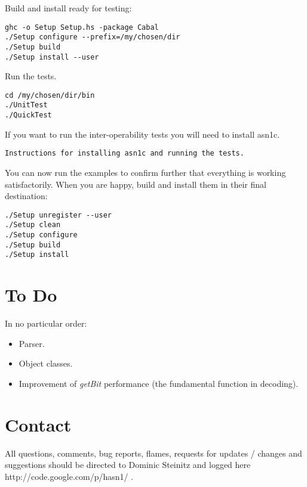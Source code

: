 \documentclass{article}
\begin{document}
Build and install ready for testing:

\begin{lstlisting}[frame=single]
ghc -o Setup Setup.hs -package Cabal
./Setup configure --prefix=/my/chosen/dir
./Setup build
./Setup install --user
\end{lstlisting}

Run the tests.

\begin{lstlisting}[frame=single]
cd /my/chosen/dir/bin
./UnitTest
./QuickTest
\end{lstlisting}

If you want to run the inter-operability tests you will need to install asn1c.

\begin{lstlisting}[frame=single]
Instructions for installing asn1c and running the tests.
\end{lstlisting}

You can now run the examples to confirm further that everything
is working satisfactorily.
When you are happy, build and install them in
their final destination:

\begin{lstlisting}[frame=single]
./Setup unregister --user
./Setup clean
./Setup configure
./Setup build
./Setup install
\end{lstlisting}

\section{To Do}

In no particular order:

\begin{itemize}

\item
Parser.

\item
Object classes.

\item
Improvement of {\em getBit} performance (the fundamental function in decoding).

\end{itemize}

\section{Contact}

All questions, comments, bug reports, flames, requests for 
updates / changes and suggestions should be directed to Dominic Steinitz and
logged
\htmladdnormallinkfoot
{here}
{http://code.google.com/p/hasn1/}
.
\end{document}
